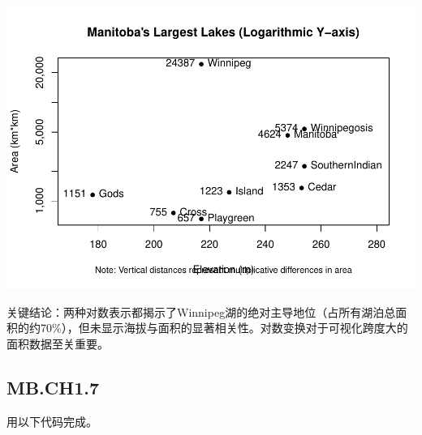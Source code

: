 \documentclass[
]{article}
\begin{document}
\includegraphics{3220103606-homework1_files/figure-latex/unnamed-chunk-16-1.pdf}

关键结论：两种对数表示都揭示了Winnipeg湖的绝对主导地位（占所有湖泊总面积的约70\%），但未显示海拔与面积的显著相关性。对数变换对于可视化跨度大的面积数据至关重要。

\subsection{MB.CH1.7}\label{mb.ch1.7}

用以下代码完成。
\end{document}
